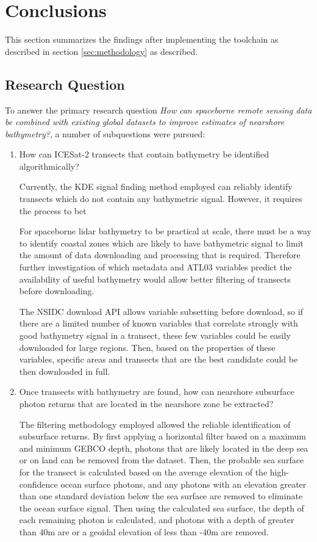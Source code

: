 \chapter{Conclusions}
This section summarizes the findings after implementing the toolchain as described in section \ref{sec:methodology} as described.

\section{Research Question}
To answer the primary research question \emph{How can spaceborne remote sensing data be combined with existing global datasets to improve estimates of nearshore bathymetry?}, a number of subquestions were pursued:

\begin{enumerate}
    \item How can ICESat-2 transects that contain bathymetry be identified algorithmically?

    Currently, the KDE signal finding method employed can reliably identify transects which do not contain any bathymetric signal. However, it requires the process to bet 
    
    For spaceborne lidar bathymetry to be practical at scale, there must be a way to identify coastal zones which are likely to have bathymetric signal to limit the amount of data downloading and processing that is required. Therefore further investigation of which metadata and ATL03 variables predict the availability of useful bathymetry would allow better filtering of transects before downloading. 
    
    The NSIDC download API allows variable subsetting before download, so if there are a limited number of known variables that correlate strongly with good bathymetry signal in a transect, these few variables could be easily downloaded for large regions.  
    Then, based on the properties of these variables, specific areas and transects that are the best candidate could be then downloaded in full.
    
    \item Once transects with bathymetry are found, how can nearshore subsurface photon returns that are located in the nearshore zone be extracted?
    
    The filtering methodology employed allowed the reliable identification of subsurface returns. By first applying a horizontal filter based on a maximum and minimum GEBCO depth, photons that are likely located in the deep sea or on land can be removed from the dataset. Then, the probable sea surface for the transect is calculated based on the average elevation of the high-confidence ocean surface photons, and any photons with an elevation greater than one standard deviation below the sea surface are removed to eliminate the ocean surface signal. Then using the calculated sea surface, the depth of each remaining photon is calculated, and photons with a depth of greater than 40m are or a geoidal elevation of less than -40m are removed. 
    

\end{enumerate}
